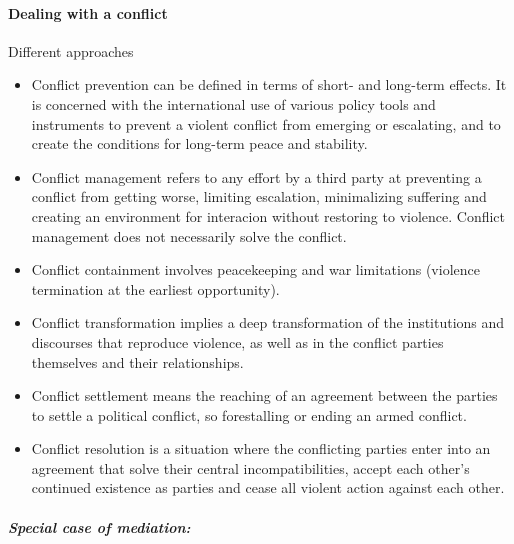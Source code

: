 \paragraph{Dealing with a conflict}

Different approaches

\begin{itemize}
    \item Conflict prevention can be defined in terms of short- and long-term
        effects. It is concerned with the international use of various policy
        tools and instruments to prevent a violent conflict from emerging
        or escalating, and to create the conditions for long-term peace and
        stability.
    \item Conflict management refers to any effort by a third party at
        preventing a conflict from getting worse, limiting escalation,
        minimalizing suffering and creating an environment for interacion
        without restoring to violence. Conflict management does not necessarily
        solve the conflict.
    \item Conflict containment involves peacekeeping and war limitations
        (violence termination at the earliest opportunity).
    \item Conflict transformation implies a deep transformation of the
        institutions and discourses that reproduce violence, as well as in the
        conflict parties themselves and their relationships.
    \item Conflict settlement means the reaching of an agreement between
        the parties to settle a political conflict, so forestalling or ending
        an armed conflict.
    \item Conflict resolution is a situation where the conflicting parties
        enter into an agreement that solve their central incompatibilities,
        accept each other's continued existence as parties and cease all
        violent action against each other.
\end{itemize}

\subparagraph{Special case of mediation:}

